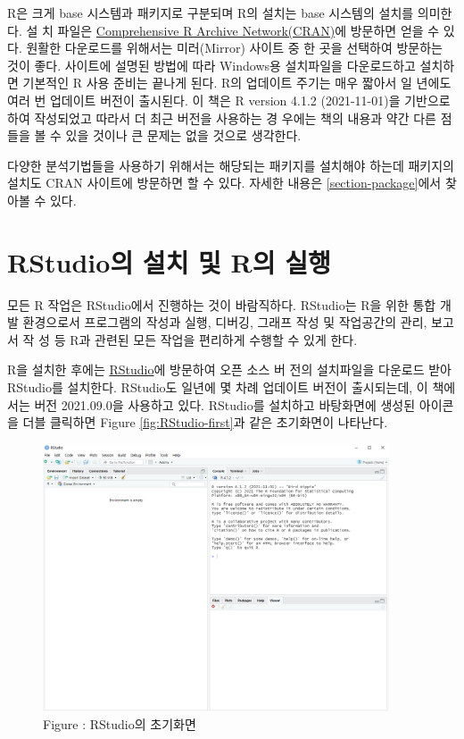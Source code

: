 \documentclass[
]{book}
\begin{document}
R은 크게 base 시스템과 패키지로 구분되며 R의 설치는 base 시스템의 설치를
의미한다. 설 치 파일은 \href{https://cran.r-project.org}{Comprehensive R Archive
Network(CRAN)}에 방문하면 얻을 수 있다.
원활한 다운로드를 위해서는 미러(Mirror) 사이트 중 한 곳을 선택하여
방문하는 것이 좋다. 사이트에 설명된 방법에 따라 Windows용 설치파일을
다운로드하고 설치하면 기본적인 R 사용 준비는 끝나게 된다. R의 업데이트
주기는 매우 짧아서 일 년에도 여러 번 업데이트 버전이 출시된다. 이 책은
R version 4.1.2 (2021-11-01)을 기반으로 하여 작성되었고 따라서
더 최근 버전을 사용하는 경 우에는 책의 내용과 약간 다른 점들을 볼 수
있을 것이나 큰 문제는 없을 것으로 생각한다.

다양한 분석기법들을 사용하기 위해서는 해당되는 패키지를 설치해야 하는데
패키지의 설치도 CRAN 사이트에 방문하면 할 수 있다. 자세한 내용은
\ref{section-package}에서 찾아볼 수 있다.

\hypertarget{rstudiouxc758-uxc124uxce58-uxbc0f-ruxc758-uxc2e4uxd589}{%
\section{RStudio의 설치 및 R의 실행}\label{rstudiouxc758-uxc124uxce58-uxbc0f-ruxc758-uxc2e4uxd589}}

모든 R 작업은 RStudio에서 진행하는 것이 바람직하다. RStudio는 R을 위한
통합 개발 환경으로서 프로그램의 작성과 실행, 디버깅, 그래프 작성 및
작업공간의 관리, 보고서 작 성 등 R과 관련된 모든 작업을 편리하게 수행할
수 있게 한다.

R을 설치한 후에는 \href{https://www.rstudio.com/}{RStudio}에 방문하여 오픈
소스 버 전의 설치파일을 다운로드 받아 RStudio를 설치한다. RStudio도
일년에 몇 차례 업데이트 버전이 출시되는데, 이 책에서는 버전 2021.09.0을
사용하고 있다. RStudio를 설치하고 바탕화면에 생성된 아이콘을 더블
클릭하면 Figure \ref{fig:RStudio-first}과 같은 초기화면이 나타난다.

\begin{figure}
\hypertarget{RStudio-first}{%
\centering
\includegraphics[width=4.04in,height=\textheight]{Figure/ch1_RStudio_first.PNG}
\caption{Figure : RStudio의
초기화면}\label{RStudio-first}
}
\end{figure}
\end{document}
